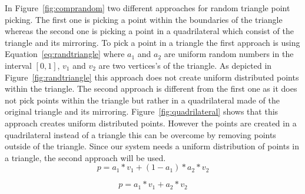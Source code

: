 In Figure~\ref{fig:comprandom} two different approaches for random triangle point picking. The first one is picking a point within the boundaries of the triangle whereas the second one is picking a  point in a  quadrilateral which consist of the triangle and its mirroring. To pick a point in a triangle the first approach is using Equation~\ref{eq:randtriangle} where $a_1$ and $a_2$ are uniform random numbers in the interval $ \left[0,1 \right] $, $v_1$ and $v_2$ are two vertices's of the triangle. As depicted in Figure~\ref{fig:randtriangle} this approach does not create uniform distributed points within the triangle. The second approach is different from the first one as it does not pick points within the triangle but rather in a quadrilateral made of the original triangle and its mirroring. Figure~\ref{fig:quadrilateral} shows that this approach creates uniform distributed points. However the points are created in a quadrilateral instead of a triangle this can be overcome by removing points outside of the triangle. Since our system needs a uniform distribution of points in a triangle, the second approach will be used.
\begin{equation}
	p=a_1*v_1+(1-a_1)*a_2*v_2
	\label{eq:randtriangle}
\end{equation}

\begin{equation}
	p=a_1*v_1+a_2*v_2
	\label{eq:randquad}
\end{equation}



